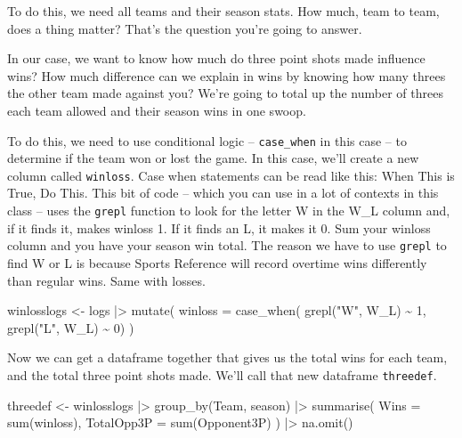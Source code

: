 \documentclass[
  letterpaper,
  DIV=11,
  numbers=noendperiod]{scrreprt}
\newenvironment{Shaded}{\begin{snugshade}}{\end{snugshade}}
\newcommand{\AttributeTok}[1]{\textcolor[rgb]{0.40,0.45,0.13}{#1}}
\newcommand{\DecValTok}[1]{\textcolor[rgb]{0.68,0.00,0.00}{#1}}
\newcommand{\FunctionTok}[1]{\textcolor[rgb]{0.28,0.35,0.67}{#1}}
\newcommand{\NormalTok}[1]{\textcolor[rgb]{0.00,0.23,0.31}{#1}}
\newcommand{\OtherTok}[1]{\textcolor[rgb]{0.00,0.23,0.31}{#1}}
\newcommand{\SpecialCharTok}[1]{\textcolor[rgb]{0.37,0.37,0.37}{#1}}
\newcommand{\StringTok}[1]{\textcolor[rgb]{0.13,0.47,0.30}{#1}}
\begin{document}
To do this, we need all teams and their season stats. How much, team to
team, does a thing matter? That's the question you're going to answer.

In our case, we want to know how much do three point shots made
influence wins? How much difference can we explain in wins by knowing
how many threes the other team made against you? We're going to total up
the number of threes each team allowed and their season wins in one
swoop.

To do this, we need to use conditional logic -- \texttt{case\_when} in
this case -- to determine if the team won or lost the game. In this
case, we'll create a new column called \texttt{winloss}. Case when
statements can be read like this: When This is True, Do This. This bit
of code -- which you can use in a lot of contexts in this class -- uses
the \texttt{grepl} function to look for the letter W in the W\_L column
and, if it finds it, makes winloss 1. If it finds an L, it makes it 0.
Sum your winloss column and you have your season win total. The reason
we have to use \texttt{grepl} to find W or L is because Sports Reference
will record overtime wins differently than regular wins. Same with
losses.

\begin{Shaded}
\begin{Highlighting}[]
\NormalTok{winlosslogs }\OtherTok{\textless{}{-}}\NormalTok{ logs }\SpecialCharTok{|\textgreater{}} 
  \FunctionTok{mutate}\NormalTok{(}
    \AttributeTok{winloss =} \FunctionTok{case\_when}\NormalTok{(}
      \FunctionTok{grepl}\NormalTok{(}\StringTok{"W"}\NormalTok{, W\_L) }\SpecialCharTok{\textasciitilde{}} \DecValTok{1}\NormalTok{, }
      \FunctionTok{grepl}\NormalTok{(}\StringTok{"L"}\NormalTok{, W\_L) }\SpecialCharTok{\textasciitilde{}} \DecValTok{0}\NormalTok{)}
\NormalTok{)}
\end{Highlighting}
\end{Shaded}

Now we can get a dataframe together that gives us the total wins for
each team, and the total three point shots made. We'll call that new
dataframe \texttt{threedef}.

\begin{Shaded}
\begin{Highlighting}[]
\NormalTok{threedef }\OtherTok{\textless{}{-}}\NormalTok{ winlosslogs }\SpecialCharTok{|\textgreater{}} 
  \FunctionTok{group\_by}\NormalTok{(Team, season) }\SpecialCharTok{|\textgreater{}} 
  \FunctionTok{summarise}\NormalTok{(}
    \AttributeTok{Wins =} \FunctionTok{sum}\NormalTok{(winloss), }
    \AttributeTok{TotalOpp3P =} \FunctionTok{sum}\NormalTok{(Opponent3P)}
\NormalTok{    ) }\SpecialCharTok{|\textgreater{}} \FunctionTok{na.omit}\NormalTok{()}
\end{Highlighting}
\end{Shaded}
\end{document}
